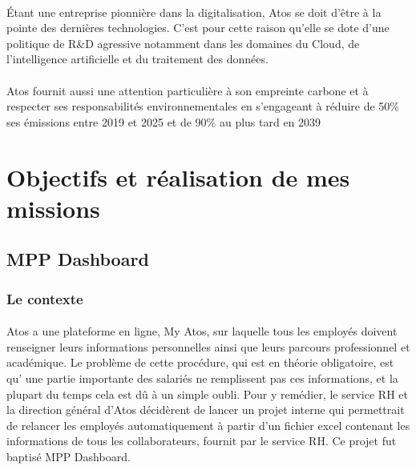 \documentclass[12pt]{article}
\begin{document}
\begin {sloppypar}
\paragraph{}
Étant une entreprise pionnière dans la digitalisation, Atos se doit d'être à la pointe
des dernières technologies. C'est pour cette raison qu'elle se dote d'une politique 
de R\&D agressive notamment dans les domaines du Cloud, de l'intelligence artificielle 
et du traitement des données.
\paragraph{}
Atos fournit aussi une attention particulière à son empreinte carbone et à respecter ses responsabilités environnementales
en s'engageant à réduire de 50\% ses émissions entre 2019 et 2025 et de 90\% au plus tard en 2039 
\newpage
\section {Objectifs et réalisation de mes missions}
\subsection {MPP Dashboard}
\subsubsection {Le contexte} \paragraph {}
Atos a une plateforme en ligne, My Atos, sur laquelle tous les employés doivent 
renseigner leurs informations personnelles ainsi que leurs parcours professionnel et 
académique. Le problème de cette procédure, qui est en théorie obligatoire, est qu' 
une partie importante des salariés ne remplissent pas ces informations, et la plupart 
du temps cela est dû à un simple oubli. Pour y remédier, le service RH et la direction 
général d'Atos décidèrent de lancer un projet interne qui permettrait de relancer 
les employés automatiquement à partir d'un fichier excel contenant les informations 
de tous les collaborateurs, fournit par le service RH. Ce projet fut baptisé MPP Dashboard.


\end{sloppypar}
\end{document}
